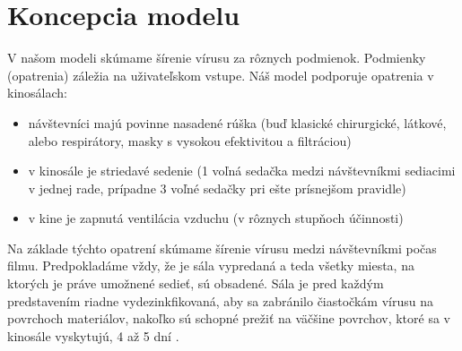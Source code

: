 \documentclass[a4paper, 11pt]{article}
\begin{document}
    \section{Koncepcia modelu}
    V našom modeli skúmame šírenie vírusu za rôznych podmienok. Podmienky (opatrenia) záležia na uživateľskom vstupe. Náš model podporuje opatrenia v kinosálach: 
        \begin{itemize}
            \item návštevníci majú povinne nasadené rúška (buď klasické chirurgické, látkové, alebo respirátory, masky s vysokou efektivitou a filtráciou)
            \item v kinosále je striedavé sedenie (1 voľná sedačka medzi návštevníkmi sediacimi v jednej rade, prípadne 3 voľné sedačky pri ešte prísnejšom pravidle)
            \item v kine je zapnutá ventilácia vzduchu (v rôznych stupňoch účinnosti)
        \end{itemize}
    Na základe týchto opatrení skúmame šírenie vírusu medzi návštevníkmi počas filmu. Predpokladáme vždy, že je sála vypredaná a teda všetky miesta, na ktorých je práve umožnené sedieť, sú obsadené. Sála je pred každým predstavením riadne vydezinkfikovaná, aby sa zabránilo čiastočkám vírusu na povrchoch materiálov, nakoľko sú schopné prežiť na väčšine povrchov, ktoré sa v kinosále vyskytujú, 4 až 5 dní \cite{covidonsurface}.
    
\end{document}
